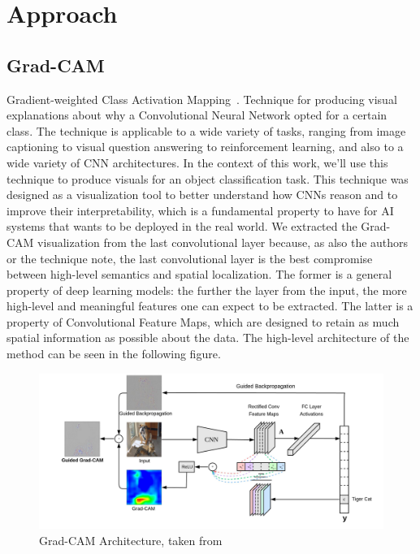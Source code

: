 \documentclass[../main.tex]{subfiles}
\begin{document}
    \chapter{Approach}\label{chap:approach}

    \section{Grad-CAM}
    Gradient-weighted Class Activation Mapping~\cite{gradcam}. Technique for producing visual explanations
    about why a Convolutional Neural Network opted for a certain class. The technique is applicable to a wide
    variety of tasks, ranging from image captioning to visual question answering to reinforcement learning, and
    also to a wide variety of CNN architectures. In the context of this work, we'll use this technique to
    produce visuals for an object classification task.
    This technique was designed as a visualization tool to better understand how CNNs reason and to improve
    their interpretability, which is a fundamental property to have for AI systems that wants to be deployed
    in the real world.
    We extracted the Grad-CAM visualization from the last convolutional layer because, as also the authors
    or the technique note, the last convolutional layer is the best compromise between high-level semantics and spatial
    localization. The former is a general property of deep learning models: the further the layer from the input,
    the more high-level and meaningful features one can expect to be extracted. The latter is a property of
    Convolutional Feature Maps, which are designed to retain as much spatial information as possible about
    the data.
    The high-level architecture of the method can be seen in the following figure.

	\begin{figure}[h!]
    	\includegraphics[width=\linewidth]{img/gradcam-architecture.png}
	    \caption{Grad-CAM Architecture, taken from~\cite{gradcam}}\label{fig:gradcam-architecture}
	\end{figure}
\end{document}
